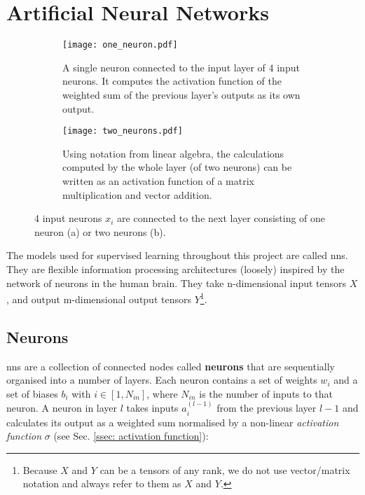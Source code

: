 \section{Artificial Neural Networks \label{sec: neural nets}}

    \begin{figure}[h]
        \centering
        \begin{subfigure}[b]{0.9\textwidth}
            \texttt{[image: one\_neuron.pdf]}
            \caption{A single \gls{neuron} connected to the input layer of 4 input \glspl{neuron}. It computes the activation function of the weighted sum of the previous layer's outputs as its own output. \label{subfig: neuron}}
        \end{subfigure}
        \hfill
        \begin{subfigure}[b]{0.9\textwidth}
            \texttt{[image: two\_neurons.pdf]}
            \caption{Using notation from linear algebra, the calculations computed by the whole layer (of two \glspl{neuron}) can be written as an activation function of a matrix multiplication and vector addition. \label{subfig: layer}}
        \end{subfigure}
        \caption{4 input \glspl{neuron} $x_i$ are connected to the next layer consisting of one \gls{neuron} (a) or two \glspl{neuron} (b).}
    \end{figure}



    The \glspl{model} used for supervised learning throughout this project are called \glspl{nn}. They are flexible information processing architectures (loosely) inspired by the network of \glspl{neuron} in the human brain. They take n-dimensional input tensors $X$, and output m-dimensional output tensors $Y$\footnote{Because $X$ and $Y$ can be a tensors of any rank, we do not use vector/matrix notation and always refer to them as $X$ and $Y$.}. %

    \subsection{Neurons}
        \Glspl{nn} are a collection of connected nodes called \textbf{\glspl{neuron}} that are sequentially organised into a number of layers. Each \gls{neuron} contains a set of weights $w_i$ and a set of biases $b_i$ with $i \in [1, N_{in}]$, where $N_{in}$ is the number of inputs to that \gls{neuron}. A \gls{neuron} in layer $l$ takes inputs $a_i^{(l-1)}$ from the previous layer $l-1$ and calculates its output as a weighted sum normalised by a non-linear \textit{activation function} $\sigma$ (see Sec. \ref{ssec: activation function}):

